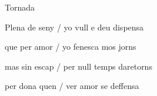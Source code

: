 \documentclass[12pt]{article}
\begin{document}
\begin{estrofaExtra}%




\begin{tornada}

Tornada

\end{tornada}


\end{estrofaExtra}


\begin{estrofa}

 Plena de seny / yo vull e deu dispensa

 que per amor / yo fenesca mos jorns

 mas sin escap / per null temps daretorns

 per dona quen / ver amor se deffensa

\end{estrofa}
\end{document}
